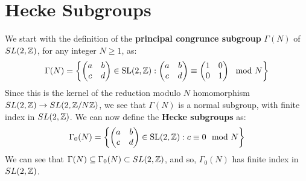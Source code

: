 \documentclass[a4paper]{article}
\begin{document}
\section{Hecke Subgroups}
We start with the definition of the \textbf{principal congrunce subgroup} $\Gamma(N)$ of $SL(2,\mathbb{Z})$, for any integer $N \geq 1$, 
as:
\[
    \Gamma(N) = \left\{
      \begin{pmatrix}
        a & b\\
        c & d
      \end{pmatrix} \in \mathrm{SL}(2,\mathbb{Z}) : \begin{pmatrix}
        a & b\\
        c & d
      \end{pmatrix} \equiv \begin{pmatrix}1 & 0 \\ 0 & 1 \end{pmatrix} \mod N
    \right\}
  \]
Since this is the kernel of the reduction modulo $N$ homomorphism $SL(2,\mathbb{Z}) \rightarrow SL(2,\mathbb{Z}/ N \mathbb{Z})$, we see that $\Gamma(N)$
is a normal subgroup, with finite index in $SL(2,\mathbb{Z})$. We can now define the \textbf{Hecke subgroups} as:
\[
    \Gamma_{0}(N) = \left\{
      \begin{pmatrix}
        a & b\\
        c & d
      \end{pmatrix} \in \mathrm{SL}(2,\mathbb{Z}) : c \equiv 0 \mod N
    \right\}
    \]
We can see that $\Gamma(N) \subseteq \Gamma_0(N) \subset SL(2,\mathbb{Z})$, and so, $\Gamma_0(N)$ has finite index in $SL(2,\mathbb{Z})$.
\end{document}
